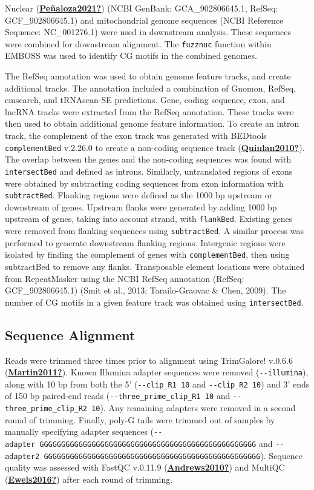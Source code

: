 \documentclass [11pt, proquest] {uwthesis}[2015/03/03]
\begin{document}
Nuclear (\protect\hyperlink{ref-Peuxf1aloza2021}{\textbf{Peñaloza2021?}}) (NCBI GenBank: GCA\_902806645.1, RefSeq: GCF\_902806645.1) and mitochondrial genome sequences (NCBI Reference Sequence: NC\_001276.1) were used in downstream analysis. These sequences were combined for downstream alignment. The \texttt{fuzznuc} function within EMBOSS was used to identify CG motifs in the combined genomes.

The RefSeq annotation was used to obtain genome feature tracks, and create additional tracks. The annotation included a combination of Gnomon, RefSeq, cmsearch, and tRNAscan-SE predictions. Gene, coding sequence, exon, and lncRNA tracks were extracted from the RefSeq annotation. These tracks were then used to obtain additional genome feature information. To create an intron track, the complement of the exon track was generated with BEDtools \texttt{complementBed} v.2.26.0 to create a non-coding sequence track (\protect\hyperlink{ref-Quinlan2010}{\textbf{Quinlan2010?}}). The overlap between the genes and the non-coding sequences was found with \texttt{intersectBed} and defined as introns. Similarly, untranslated regions of exons were obtained by subtracting coding sequences from exon information with \texttt{subtractBed}. Flanking regions were defined as the 1000 bp upstream or downstream of genes. Upstream flanks were generated by adding 1000 bp upstream of genes, taking into account strand, with \texttt{flankBed}. Existing genes were removed from flanking sequences using \texttt{subtractBed}. A similar process was performed to generate downstream flanking regions. Intergenic regions were isolated by finding the complement of genes with \texttt{complementBed}, then using subtractBed to remove any flanks. Transposable element locations were obtained from RepeatMasker using the NCBI RefSeq annotation (RefSeq: GCF\_902806645.1) (Smit et al., 2013; Tarailo-Graovac \& Chen, 2009). The number of CG motifs in a given feature track was obtained using \texttt{intersectBed}.

\hypertarget{sequence-alignment}{%
\subsection{Sequence Alignment}\label{sequence-alignment}}

Reads were trimmed three times prior to alignment using TrimGalore! v.0.6.6 (\protect\hyperlink{ref-Martin2011}{\textbf{Martin2011?}}). Known Illumina adapter sequences were removed (\texttt{-\/-illumina}), along with 10 bp from both the 5' (\texttt{-\/-clip\_R1\ 10} and \texttt{-\/-clip\_R2\ 10}) and 3' ends of 150 bp paired-end reads (\texttt{-\/-three\_prime\_clip\_R1\ 10} and \texttt{-\/-three\_prime\_clip\_R2\ 10}). Any remaining adapters were removed in a second round of trimming. Finally, poly-G tails were trimmed out of samples by manually specifying adapter sequences (\texttt{-\/-adapter\ GGGGGGGGGGGGGGGGGGGGGGGGGGGGGGGGGGGGGGGGGGGGGGGGGG} and \texttt{-\/-adapter2\ GGGGGGGGGGGGGGGGGGGGGGGGGGGGGGGGGGGGGGGGGGGGGGGGGG}). Sequence quality was assessed with FastQC v.0.11.9 (\protect\hyperlink{ref-Andrews2010}{\textbf{Andrews2010?}}) and MultiQC (\protect\hyperlink{ref-Ewels2016}{\textbf{Ewels2016?}}) after each round of trimming.
\end{document}
